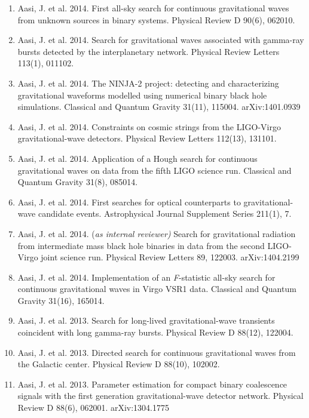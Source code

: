\documentclass[margin,line]{res}
\begin{document}
\begin{resume}
\begin{enumerate}
\item Aasi, J. et al. 2014. First all-sky search for continuous gravitational waves from unknown sources in binary systems. Physical Review D  90(6), 062010. 

\item Aasi, J. et al. 2014. Search for gravitational waves associated with gamma-ray bursts detected by the interplanetary network. Physical Review Letters 113(1), 011102. 

\item Aasi, J. et al. 2014. The NINJA-2 project: detecting and characterizing gravitational waveforms modelled using numerical binary black hole simulations. Classical and Quantum Gravity 31(11),  115004.  arXiv:1401.0939

\item Aasi, J. et al. 2014. Constraints on cosmic strings from the LIGO-Virgo gravitational-wave detectors. Physical Review Letters 112(13), 131101. 

\item Aasi, J. et al. 2014. Application of a Hough search for continuous gravitational waves on data from the fifth LIGO science run. Classical and Quantum Gravity 31(8), 085014. 

\item Aasi, J. et al. 2014. First searches for optical counterparts to gravitational-wave candidate events. Astrophysical Journal Supplement Series 211(1), 7. 

\item  Aasi, J. et al.  2014.  {(\it as internal reviewer)}  Search for gravitational radiation from intermediate mass black hole binaries in data from the second LIGO-Virgo joint science run.  Physical Review Letters 89, 122003.  arXiv:1404.2199

\item Aasi, J. et al. 2014. Implementation of an {\it F}-statistic all-sky search for continuous gravitational waves in Virgo VSR1 data. Classical and Quantum Gravity 31(16), 165014.

\item Aasi, J. et al. 2013. Search for long-lived gravitational-wave transients coincident with long gamma-ray bursts. Physical Review D 88(12), 122004. 

\item Aasi, J. et al. 2013. Directed search for continuous gravitational waves from the Galactic center. Physical Review D 88(10), 102002. 

\item Aasi, J. et al. 2013. Parameter estimation for compact binary coalescence signals with the first generation gravitational-wave detector network. Physical Review D 88(6), 062001.  arXiv:1304.1775


\end{enumerate}
\end{resume}
\end{document}
